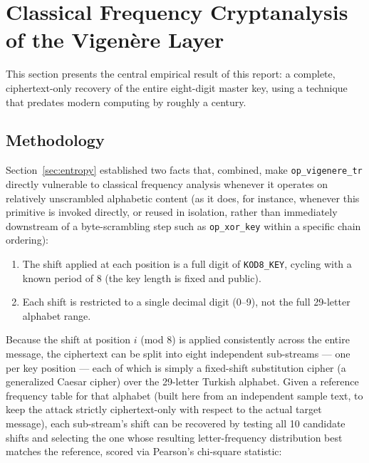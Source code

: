 \documentclass[11pt]{article}
\begin{document}
\section{Classical Frequency Cryptanalysis of the Vigen\`ere Layer}
\label{sec:freq}

This section presents the central empirical result of this report: a
complete, ciphertext-only recovery of the entire eight-digit master
key, using a technique that predates modern computing by roughly a
century.

\subsection{Methodology}

Section~\ref{sec:entropy} established two facts that, combined, make
\texttt{op\_vigenere\_tr} directly vulnerable to classical frequency
analysis whenever it operates on relatively unscrambled alphabetic
content (as it does, for instance, whenever this primitive is invoked
directly, or reused in isolation, rather than immediately downstream of
a byte-scrambling step such as \texttt{op\_xor\_key} within a specific
chain ordering):

\begin{enumerate}[leftmargin=1.6em]
\item The shift applied at each position is a full digit of
\texttt{KOD8\_KEY}, cycling with a known period of 8 (the key length is
fixed and public).
\item Each shift is restricted to a single decimal digit (0–9), not
the full 29-letter alphabet range.
\end{enumerate}

Because the shift at position $i$ (mod 8) is applied consistently
across the entire message, the ciphertext can be split into eight
independent sub-streams --- one per key position --- each of which is
simply a fixed-shift substitution cipher (a generalized Caesar cipher)
over the 29-letter Turkish alphabet. Given a reference frequency table
for that alphabet (built here from an independent sample text, to keep
the attack strictly ciphertext-only with respect to the actual
target message), each sub-stream's shift can be recovered by testing
all 10 candidate shifts and selecting the one whose resulting
letter-frequency distribution best matches the reference, scored via
Pearson's chi-square statistic:
\end{document}
